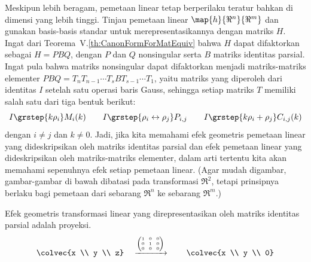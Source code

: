 Meskipun lebih beragam, pemetaan linear tetap berperilaku teratur bahkan di
dimensi yang lebih tinggi.
Tinjau pemetaan linear $\map{h}{\Re^n}{\Re^m}$ dan gunakan basis-basis standar
untuk merepresentasikannya dengan matriks $H$.
Ingat dari Teorema~V.\ref{th:CanonFormForMatEquiv} bahwa $H$ dapat difaktorkan
sebagai $H=PBQ$, dengan $P$ dan $Q$ nonsingular serta $B$ matriks identitas
parsial. Ingat pula bahwa matriks nonsingular dapat difaktorkan menjadi
matriks-matriks elementer%
$PBQ=T_nT_{n-1}\cdots T_sBT_{s-1}\cdots T_1$,
yaitu matriks yang diperoleh dari identitas $I$ setelah satu operasi baris
Gauss, sehingga setiap matriks $T$ memiliki salah satu dari tiga bentuk berikut:
\begin{equation*}
  I\grstep{k\rho_i}M_i(k) 
  \qquad 
  I\grstep{\rho_i\leftrightarrow\rho_j}P_{i,j}  
  \qquad
  I\grstep{k\rho_i+\rho_j}C_{i,j}(k) 
\end{equation*}
dengan $i\neq j$ dan $k\neq 0$.
Jadi, jika kita memahami efek geometris pemetaan linear yang dideskripsikan oleh
matriks identitas parsial dan efek pemetaan linear yang dideskripsikan oleh
matriks-matriks elementer, dalam arti tertentu kita akan memahami sepenuhnya
efek setiap pemetaan linear.
(Agar mudah digambar, gambar-gambar di bawah dibatasi pada transformasi $\Re^2$,
tetapi prinsipnya berlaku bagi pemetaan dari sebarang $\Re^n$ ke sebarang
$\Re^m$.)

Efek geometris transformasi linear yang direpresentasikan oleh matriks identitas
parsial adalah proyeksi.
\begin{equation*}
  \colvec{x \\ y  \\ z}
  \quad\xrightarrow{{\text{\tiny$\displaystyle\left(\begin{array}[r]{@{}c@{\hspace{0.8em}}c@{\hspace{0.8em}}c@{}}
                1  &0  &0 \\
                0  &1  &0 \\
                0  &0  &0
          \end{array}\right)$}}}
  \qquad
  \colvec{x \\ y  \\ 0}
\end{equation*}

